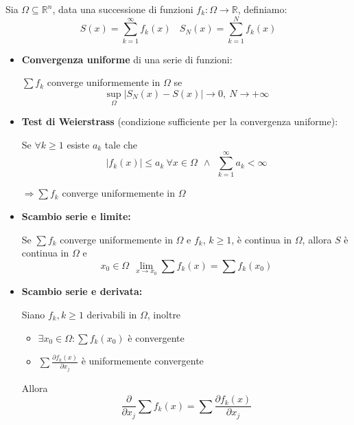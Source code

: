 \documentclass[10pt,a4paper,twoside,openright]{book}
\begin{document}
Sia $\Omega \subseteq \mathbb{R}^{n}$, data una successione di funzioni $\displaystyle f_{k} :\Omega \rightarrow \mathbb{R}$, definiamo:
\begin{equation*}
S(x) =\sum\limits ^{\infty }_{k=1} f_{k}(x) \ \ \ \ S_{N}(x) =\sum\limits ^{N}_{k=1} f_{k}(x)
\end{equation*}
\begin{itemize}
\item \textbf{Convergenza uniforme} di una serie di funzioni: 

$\sum f_{k}$ converge uniformemente in $\Omega $ se \begin{equation*}
\sup _{\Omega }| S_{N}(x) -S(x)| \rightarrow 0,\ N\rightarrow +\infty 
\end{equation*}
\item \textbf{Test di Weierstrass} (condizione sufficiente per la convergenza uniforme):

Se $\forall k\geqslant 1$ esiste $a_{k}$ tale che\begin{equation*}
| f_{k}(x)| \leqslant a_{k} \ \forall x\in \Omega \ \ \land \ \ \sum\limits ^{\infty }_{k=1} a_{k} < \infty 
\end{equation*}

$\Rightarrow \sum f_{k}$ converge uniformemente in $\Omega $


\item \textbf{Scambio serie e limite: }

Se $\sum f_{k}$ converge uniformemente in $\Omega $ e $f_{k}$, $k\geqslant 1$, è continua in $\Omega $, allora $S$ è continua in $\Omega $ e\begin{equation*}
x_{0} \in \Omega \ \ \lim\limits _{x\rightarrow x_{0}}\sum f_{k}(x) =\sum f_{k}(x_{0})
\end{equation*}


\item \textbf{Scambio serie e derivata: }

Siano $f_{k},k\geqslant 1$ derivabili in $\Omega $, inoltre
\begin{itemize}
\item $\exists x_{0} \in \Omega :\sum f_{k}(x_{0})$ è convergente
\item $\sum \frac{\partial f_{k}(x)}{\partial x_{j}}$ è uniformemente convergente
\end{itemize}

Allora\begin{equation*}
\frac{\partial }{\partial x_{j}}\sum f_{k}(x) =\sum \frac{\partial f_{k}(x)}{\partial x_{j}}
\end{equation*}
\end{itemize}
\end{document}
